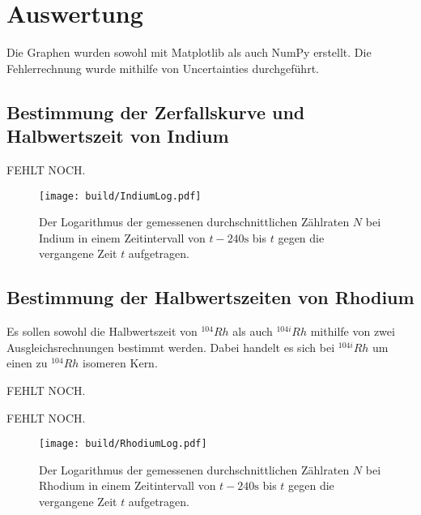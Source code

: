 \section{Auswertung}
\label{sec:Auswertung}


Die Graphen wurden sowohl mit Matplotlib \cite{matplotlib} als auch NumPy \cite{numpy} erstellt. Die
Fehlerrechnung wurde mithilfe von Uncertainties \cite{uncertainties} durchgeführt.


\subsection{Bestimmung der Zerfallskurve und Halbwertszeit von Indium}
 \begin{table}
  \centering
  \caption{FEHLT NOCH.}
  
 \end{table}
\begin{figure}
	\centering
	\caption{Der Logarithmus der gemessenen durchschnittlichen Zählraten $N$ bei Indium in einem Zeitintervall von $t-240\si{\second}$ bis $t$ gegen die vergangene Zeit $t$ aufgetragen.}
	\texttt{[image: build/IndiumLog.pdf]}
	\label{fig:Indium}
\end{figure}

\subsection{Bestimmung der Halbwertszeiten von Rhodium}
Es sollen sowohl die Halbwertszeit von $^{104} Rh$ als auch $^{104i} Rh$ mithilfe von zwei Ausgleichsrechnungen bestimmt werden. Dabei handelt es sich bei $^{104i} Rh$ um einen zu $^{104} Rh$ isomeren Kern.
 \begin{table}
	\centering
	\caption{FEHLT NOCH.}
	
\end{table}
\begin{table}
	\centering
	\caption{FEHLT NOCH.}
	
\end{table}
\begin{figure}
	\centering
	\caption{Der Logarithmus der gemessenen durchschnittlichen Zählraten $N$ bei Rhodium in einem Zeitintervall von $t-240\si{\second}$ bis $t$ gegen die vergangene Zeit $t$ aufgetragen.}
	\texttt{[image: build/RhodiumLog.pdf]}
	\label{fig:Rhodium}
\end{figure}



